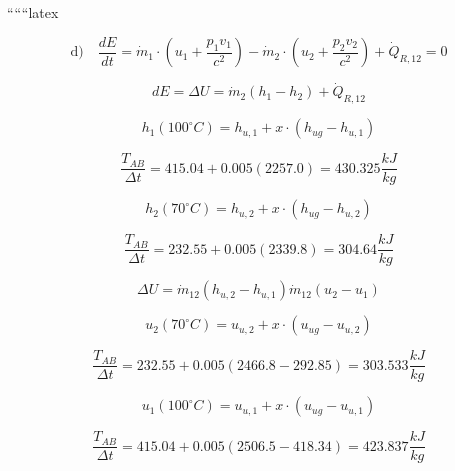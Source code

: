 ``````latex


\begin{equation*}
\text{d)} \quad \frac{dE}{dt} = \dot{m}_1 \cdot \left( u_1 + \frac{p_1 v_1}{c^2} \right) - \dot{m}_2 \cdot \left( u_2 + \frac{p_2 v_2}{c^2} \right) + \dot{Q}_{R,12} = 0
\end{equation*}

\begin{equation*}
dE = \Delta U = \dot{m}_2 \left( h_1 - h_2 \right) + \dot{Q}_{R,12}
\end{equation*}

\begin{equation*}
h_1 (100^\circ C) = h_{u,1} + x \cdot \left( h_{ug} - h_{u,1} \right)
\end{equation*}

\begin{equation*}
\frac{T_{AB}}{\Delta t} = 415.04 + 0.005 \left( 2257.0 \right) = 430.325 \frac{kJ}{kg}
\end{equation*}

\begin{equation*}
h_2 (70^\circ C) = h_{u,2} + x \cdot \left( h_{ug} - h_{u,2} \right)
\end{equation*}

\begin{equation*}
\frac{T_{AB}}{\Delta t} = 232.55 + 0.005 \left( 2339.8 \right) = 304.64 \frac{kJ}{kg}
\end{equation*}

\begin{equation*}
\Delta U = \dot{m}_{12} \left( h_{u,2} - h_{u,1} \right) \dot{m}_{12} \left( u_2 - u_1 \right)
\end{equation*}

\begin{equation*}
u_2 (70^\circ C) = u_{u,2} + x \cdot \left( u_{ug} - u_{u,2} \right)
\end{equation*}

\begin{equation*}
\frac{T_{AB}}{\Delta t} = 232.55 + 0.005 \left( 2466.8 - 292.85 \right) = 303.533 \frac{kJ}{kg}
\end{equation*}

\begin{equation*}
u_1 (100^\circ C) = u_{u,1} + x \cdot \left( u_{ug} - u_{u,1} \right)
\end{equation*}

\begin{equation*}
\frac{T_{AB}}{\Delta t} = 415.04 + 0.005 \left( 2506.5 - 418.34 \right) = 423.837 \frac{kJ}{kg}
\end{equation*}

